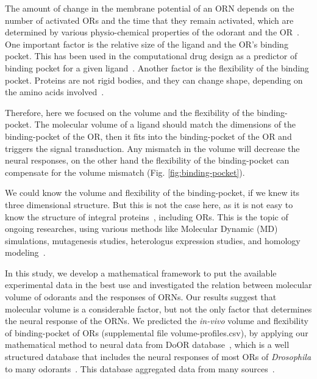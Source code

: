 \documentclass[fleqn,10pt]{wlscirep} %
\begin{document}

The amount of change in the membrane potential of an ORN depends on the number of activated ORs and the time that they remain activated,
which are determined by various physio-chemical properties of the odorant and the OR~\cite{Turin,Araneda2000,Gabler2013,guerrieri2005,uchida2000}.
One important factor is the relative size of the ligand and the OR's binding pocket. 
This has been used in the computational drug design as a predictor of binding pocket for a given ligand~\cite{liang1998anatomy}. 
Another factor is the flexibility of the binding pocket. 
Proteins are not rigid bodies,  
and they can change shape, 
depending on the amino acids involved~\cite{Ramachandran,apostolakis1998docking,gunasekaran2007different}.

Therefore, here we focused on the volume and the flexibility of the binding-pocket.
The molecular volume of a ligand should match the dimensions of the binding-pocket of the OR,
then it fits into the binding-pocket of the OR and triggers the signal transduction. 
Any mismatch in the volume will decrease the neural responses, 
on the other hand the flexibility of the binding-pocket can compensate for the volume mismatch (Fig. \ref{fig:binding-pocket}).

We could know the volume and flexibility of the binding-pocket, 
if we knew its three dimensional structure. 
But this is not the case here, 
as it is not easy to know the structure of integral proteins~\cite{Zhang2008,Lupieri2009}, 
including ORs. 
This is the topic of ongoing researches, 
using various methods like Molecular Dynamic (MD) simulations, 
mutagenesis studies, heterologus expression studies, and homology modeling~\cite{Khafizov2007,Man2004,Lai2005,Vaidehi2002,Floriano2004,Schmiedeberg2007,Katada2005,Kato2008,Rospars2013}.

In this study, 
we develop a mathematical framework to put the available experimental data in the best use and
investigated the relation between molecular volume of odorants and the responses of ORNs. 
Our results suggest that molecular volume is a considerable factor, 
but not the only factor that determines the neural response of the ORNs.
We predicted the {\it in-vivo} volume and flexibility of binding-pocket of ORs (supplemental file volume-profiles.csv), 
by applying our mathematical method to neural data from DoOR database~\cite{Galizia2010}, 
which is a well structured database that includes the neural responses of most ORs of \textit{Drosophila} to many odorants~\cite{Galizia2010}. 
This database aggregated data from many sources~\cite{Bruyne1999,Bruyne2001,Dobritsa2003,Goldman2005,Hallem2004,Hallem2006,
Kreher2005,Kreher2008,Kwon2007,Pelz2006,Pelz2006,Schmuker2007,Stensmyr2003,
Turner2009,VanderGoesvanNaters2007,Yao2005}.
\end{document}
